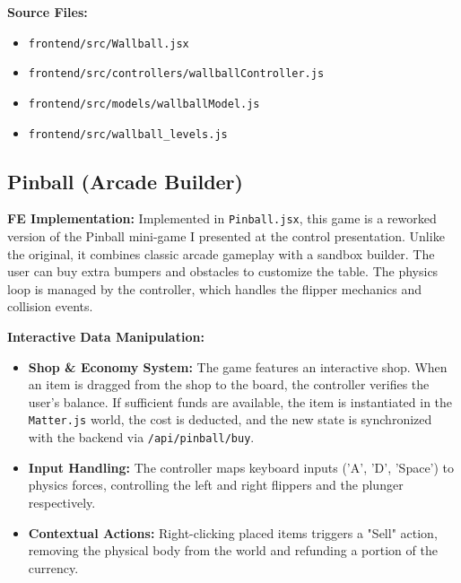 \documentclass[11pt]{article}
\begin{document}
\textbf{Source Files:}
\begin{itemize}
    \item \texttt{frontend/src/Wallball.jsx}
    \item \texttt{frontend/src/controllers/wallballController.js}
    \item \texttt{frontend/src/models/wallballModel.js}
    \item \texttt{frontend/src/wallball\_levels.js}
\end{itemize}

\subsection{Pinball (Arcade Builder)}
\textbf{FE Implementation:}
Implemented in \texttt{Pinball.jsx}, this game is a reworked version of the Pinball mini-game I presented at the control presentation. Unlike the original, it combines classic arcade gameplay with a sandbox builder. The user can buy extra bumpers and obstacles to customize the table. The physics loop is managed by the controller, which handles the flipper mechanics and collision events.

\textbf{Interactive Data Manipulation:}
\begin{itemize}
    \item \textbf{Shop \& Economy System:}
    The game features an interactive shop. When an item is dragged from the shop to the board, the controller verifies the user's balance. If sufficient funds are available, the item is instantiated in the \texttt{Matter.js} world, the cost is deducted, and the new state is synchronized with the backend via \texttt{/api/pinball/buy}.
    
    \item \textbf{Input Handling:}
    The controller maps keyboard inputs ('A', 'D', 'Space') to physics forces, controlling the left and right flippers and the plunger respectively.
    
    \item \textbf{Contextual Actions:}
    Right-clicking placed items triggers a "Sell" action, removing the physical body from the world and refunding a portion of the currency.
\end{itemize}
\end{document}
